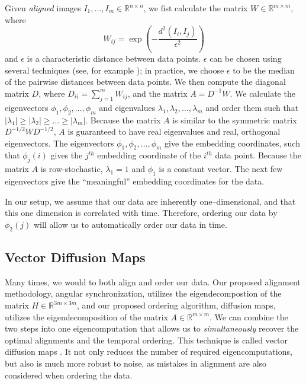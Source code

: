 \documentclass[11pt]{article}
\begin{document}
Given {\em aligned} images $I_1, \dots, I_m \in \mathbb{R}^{n \times n}$, we fist calculate the matrix $W \in \mathbb{R}^{m \times m}$, where 
\begin{equation} \label{eq:dmaps_W}
W_{ij} = \exp \left( -\frac{d^2(I_i, I_j)}{\epsilon^2} \right)
\end{equation}
and $\epsilon$ is a characteristic distance between data points.
%
$\epsilon$ can be chosen using several techniques (see, for example \cite{coifman2008graph}); in practice, we choose $\epsilon$ to be the median of the pairwise distances between data points.
%
We then compute the diagonal matrix $D$, where $D_{ii} = \sum_{j=1}^{m} W_{ij}$, and the matrix $A = D^{-1} W$. 
%
We calculate the eigenvectors $\phi_1, \phi_2, \dots, \phi_m$ and eigenvalues $\lambda_1, \lambda_2, \dots, \lambda_m$ and order them such that $|\lambda_1| \ge |\lambda_2| \ge \dots \ge |\lambda_m|$. 
%
Because the matrix $A$ is similar to the symmetric matrix $D^{-1/2} W D^{-1/2}$, $A$ is guaranteed to have real eigenvalues and real, orthogonal eigenvectors. 
%
The eigenvectors $\phi_1, \phi_2, \dots, \phi_m$ give the embedding coordinates, such that $\phi_j(i)$ gives the $j^{th}$ embedding coordinate of the $i^{th}$ data point. 
%
Because the matrix $A$ is row-stochastic, $\lambda_1=1$ and $\phi_1$ is a constant vector.
%
The next few eigenvectors give the ``meaningful'' embedding coordinates for the data. 

In our setup, we assume that our data are inherently one--dimensional, and that this one dimension is correlated with time.
%
Therefore, ordering our data by $\phi_2(j)$ will allow us to automatically order our data in time. 

\subsection{Vector Diffusion Maps}

Many times, we would to both align and order our data.
%
Our proposed alignment methodology, angular synchronization, utilizes the eigendecompostion of the matrix $H \in \mathbb{R}^{3m \times 3m}$, and our proposed ordering algorithm, diffusion maps, utilizes the eigendecomposition of the matrix $A \in \mathbb{R}^{m \times m}$.
%
We can combine the two steps into one eigencomputation that allows us to {\em simultaneously} recover the optimal alignments and the temporal ordering.
%
This technique is called vector diffusion maps \cite{singer2012vector}.
%
It not only reduces the number of required eigencomputations, but also is much more robust to noise, as mistakes in alignment are also considered when ordering the data.
\end{document}

